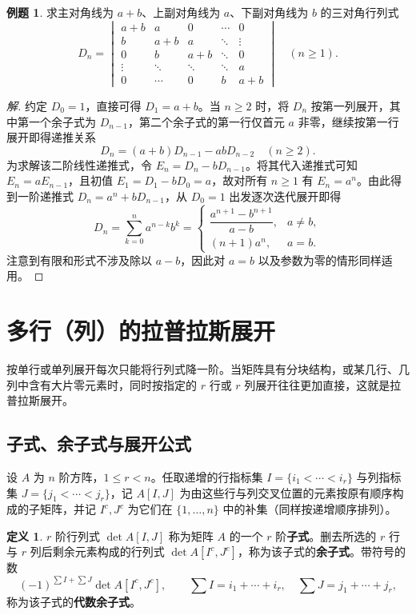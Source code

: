 \documentclass[UTF8, fontset=fandol, a4paper, 12pt]{ctexart}
\theoremstyle{definition}
\newtheorem{definition}[theorem]{定义}
\newtheorem{example}[theorem]{例题}
\begin{document}
\begin{example}
求主对角线为 $a+b$、上副对角线为 $a$、下副对角线为 $b$ 的三对角行列式
\[
 D_n=\begin{vmatrix}
 a+b&a&0&\cdots&0\\b&a+b&a&\ddots&\vdots\\
 0&b&a+b&\ddots&0\\\vdots&\ddots&\ddots&\ddots&a\\0&\cdots&0&b&a+b
 \end{vmatrix}\quad(n\ge1).
\]
\end{example}
\begin{proof}[解]
约定 $D_0=1$，直接可得 $D_1=a+b$。当 $n\ge2$ 时，将 $D_n$ 按第一列展开，其中第一个余子式为 $D_{n-1}$，第二个余子式的第一行仅首元 $a$ 非零，继续按第一行展开即得递推关系
\[
 D_n=(a+b)D_{n-1}-abD_{n-2}\quad(n\ge2).
\]
为求解该二阶线性递推式，令 $E_n=D_n-bD_{n-1}$。将其代入递推式可知 $E_n=aE_{n-1}$，且初值 $E_1=D_1-bD_0=a$，故对所有 $n\ge1$ 有 $E_n=a^n$。由此得到一阶递推式 $D_n=a^n+bD_{n-1}$，从 $D_0=1$ 出发逐次迭代展开即得
\[
 \boxed{D_n=\sum_{k=0}^n a^{n-k}b^k
 =\begin{cases}\dfrac{a^{n+1}-b^{n+1}}{a-b},&a\ne b,\\[6pt]
 (n+1)a^n,&a=b.\end{cases}}
\]
注意到有限和形式不涉及除以 $a-b$，因此对 $a=b$ 以及参数为零的情形同样适用。
\end{proof}

\section{多行（列）的拉普拉斯展开}

按单行或单列展开每次只能将行列式降一阶。当矩阵具有分块结构，或某几行、几列中含有大片零元素时，同时按指定的 $r$ 行或 $r$ 列展开往往更加直接，这就是拉普拉斯展开。

\subsection{子式、余子式与展开公式}

设 $A$ 为 $n$ 阶方阵，$1\le r<n$。任取递增的行指标集 $I=\{i_1<\cdots<i_r\}$ 与列指标集 $J=\{j_1<\cdots<j_r\}$，记 $A[I,J]$ 为由这些行与列交叉位置的元素按原有顺序构成的子矩阵，并记 $I^c,J^c$ 为它们在 $\{1,\ldots,n\}$ 中的补集（同样按递增顺序排列）。

\begin{definition}
$r$ 阶行列式 $\det A[I,J]$ 称为矩阵 $A$ 的一个 $r$ 阶\textbf{子式}。删去所选的 $r$ 行与 $r$ 列后剩余元素构成的行列式 $\det A[I^c,J^c]$，称为该子式的\textbf{余子式}。带符号的数
\[
 (-1)^{\sum I+\sum J}\det A[I^c,J^c],
 \qquad \sum I=i_1+\cdots+i_r,\quad\sum J=j_1+\cdots+j_r,
\]
称为该子式的\textbf{代数余子式}。
\end{definition}
\end{document}
